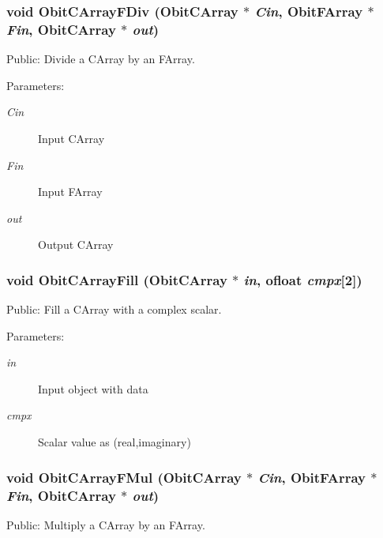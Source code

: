 \subsubsection{\setlength{\rightskip}{0pt plus 5cm}void Obit\-CArray\-FDiv ({\bf Obit\-CArray} $\ast$ {\em Cin}, {\bf Obit\-FArray} $\ast$ {\em Fin}, {\bf Obit\-CArray} $\ast$ {\em out})}\label{ObitCArray_8h_a60}


Public: Divide a CArray by an FArray. 

\begin{Desc}
\item[Parameters:]
\begin{description}
\item[{\em Cin}]Input CArray \item[{\em Fin}]Input FArray \item[{\em out}]Output CArray \end{description}
\end{Desc}
\subsubsection{\setlength{\rightskip}{0pt plus 5cm}void Obit\-CArray\-Fill ({\bf Obit\-CArray} $\ast$ {\em in}, {\bf ofloat} {\em cmpx}[2])}\label{ObitCArray_8h_a47}


Public: Fill a CArray with a complex scalar. 

\begin{Desc}
\item[Parameters:]
\begin{description}
\item[{\em in}]Input object with data \item[{\em cmpx}]Scalar value as (real,imaginary) \end{description}
\end{Desc}
\subsubsection{\setlength{\rightskip}{0pt plus 5cm}void Obit\-CArray\-FMul ({\bf Obit\-CArray} $\ast$ {\em Cin}, {\bf Obit\-FArray} $\ast$ {\em Fin}, {\bf Obit\-CArray} $\ast$ {\em out})}\label{ObitCArray_8h_a59}


Public: Multiply a CArray by an FArray. 

